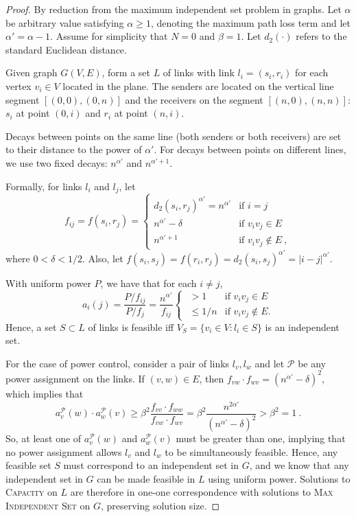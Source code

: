 \documentclass[11pt]{amsart}
\def\calP{{\mathcal{P}}}
\newcommand{\prob}[1]{\textsc{#1}}
\newcommand{\Capacity}{\prob{Capacity}}
\newcommand{\capacity}{\Capacity}
\begin{document}
\begin{proof}
By reduction from the maximum independent set problem in graphs.
Let $\alpha$ be arbitrary value satisfying $\alpha \ge 1$, 
denoting the maximum path loss term and let $\alpha' = \alpha-1$.
Assume for simplicity that $N=0$ and $\beta=1$.
Let $d_2(\cdot)$ refers to the standard Euclidean distance.

Given graph $G(V, E)$, form a set $L$ of links
with link $l_i=(s_i,r_i)$ for each vertex
$v_i\in V$ located in the plane.
The senders are located on the vertical line segment $[(0,0),(0,n)]$
and the receivers on the segment $[(n,0),(n,n)]$:
$s_i$ at point $(0,i)$ and $r_i$ at point $(n,i)$.

Decays between points on the same line (both senders or both receivers)
are set to their distance to the power of $\alpha'$.
For decays between points on different lines, 
we use two fixed decays: $n^{\alpha'}$ and $n^{\alpha'+1}$.

Formally, for links $l_i$ and $l_j$, let
 \[ f_{ij} = f(s_i,r_j) = \begin{cases}
      d_2(s_i,r_j)^{\alpha'} = n^{\alpha'} & \mbox{if } i=j \\
      n^{\alpha'} - \delta & \mbox{if } v_iv_j \in E \\
      n^{\alpha'+1} & \mbox{if } v_iv_j \not\in E\ ,
   \end{cases} \]
where $0 < \delta < 1/2$.
Also, let $f(s_i, s_j) = f(r_i, r_j) = d_2(s_i, s_j)^{\alpha'} = |i-j|^{\alpha'}$.

With uniform power $P$,
we have that for each $i \ne j$,
\[ a_i(j) = \frac{P/f_{ij}}{P/f_{j}} = \frac{n^{\alpha'}}{f_{ij}}
  \begin{cases}
    \,\,  > 1 & \mbox{if } v_iv_j \in E \\
    \,\, \le 1/n & \mbox{if } v_iv_j \not\in E.
  \end{cases} \]
Hence, a set $S \subset L$ of links is feasible iff $V_S = \{v_i \in V
: l_i \in S\}$ is an independent set.

For the case of power control, consider a pair of links $l_v, l_w$
and let $\calP$ be any power assignment on the links.
If $(v,w) \in E$, then 
$f_{vw} \cdot f_{wv} = (n^{\alpha'}-\delta)^2$, which implies that
\[ a_v^\calP(w) \cdot a_w^\calP(v) 
    \ge \beta^2 \frac{f_{vv} \cdot f_{ww}}{f_{vw} \cdot f_{wv}}
    = \beta^2 \frac{n^{2\alpha'}}{(n^{\alpha'}-\delta)^2} > \beta^2 = 1\ . \]
So, at least one of $a^\calP_v(w)$ and $a^\calP_w(v)$ must be
greater than one, implying that no power assignment allows
$l_v$ and $l_w$ to be simultaneously feasible.
Hence, any feasible set $S$ must correspond to an independent set in $G$,
and we know that any independent set in $G$ can be made feasible in
$L$ using uniform power. Solutions to {\capacity} on $L$ are therefore
in one-one correspondence with solutions to \prob{Max Independent Set}
on $G$, preserving solution size.


\end{proof}
\end{document}

